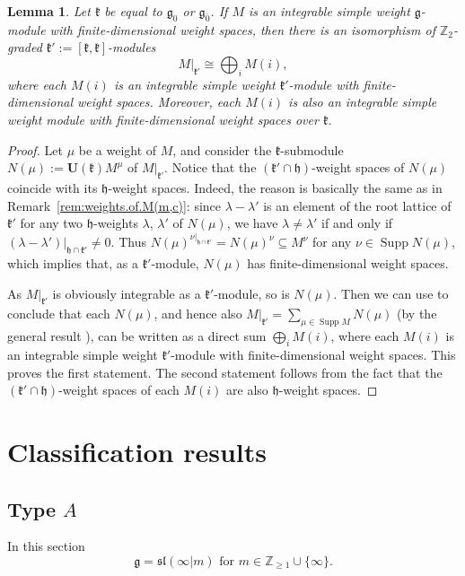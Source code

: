 \documentclass[12pt]{amsart}
\newcommand\Z{\mathbb{Z}}
\newcommand\g{\mathfrak{g}}
\newcommand\fh{\mathfrak{h}}
\newcommand\fsl{\mathfrak{sl}}
\newcommand\fk{\mathfrak{k}}
\newcommand\bU{\mathbf{U}}
\DeclareMathOperator{\Supp}{Supp} %
\theoremstyle{plain}
\newtheorem{lem}[theo]{Lemma}
\theoremstyle{definition}
\numberwithin{equation}{section}
\begin{document}
\begin{lem}\label{lem:ss.over.Lie}
Let $\fk$ be equal to $\g_0$ or $\g_{\bar 0}$. If $M$ is an integrable simple weight $\g$-module with finite-dimensional weight spaces, then there is an isomorphism of $\Z_2$-graded $\fk':=[\fk, \fk]$-modules
	\[
M|_{\fk'}\cong \bigoplus_i M(i),
	\]
where each $M(i)$ is an integrable simple weight $\fk'$-module with finite-dimensional weight spaces. Moreover, each $M(i)$ is also an integrable simple weight module with finite-dimensional weight spaces over $\fk$.
\end{lem}
\begin{proof}
Let $\mu$ be a weight of $M$, and consider the $\fk$-submodule $N(\mu) := \bU(\fk)M^\mu$ of $M|_{\fk'}$. Notice that the $(\fk'\cap \fh)$-weight spaces of $N(\mu)$ coincide with its $\fh$-weight spaces. Indeed, the reason is basically the same as in Remark~\ref{rem:weights.of.M(m,c)}: since $\lambda - \lambda'$ is an element of the root lattice of $\fk'$ for any two $\fh$-weights $\lambda$, $\lambda'$ of $N(\mu)$, we have $\lambda\neq \lambda'$ if and only if $(\lambda - \lambda') |_{\fh\cap \fk'} \neq 0$. Thus $N(\mu)^{\nu|_{\fh\cap \fk'}} = N(\mu)^\nu\subseteq M^\nu$ for any $\nu\in \Supp N(\mu)$, which implies that, as a $\fk'$-module, $N(\mu)$ has finite-dimensional weight spaces.

As $M|_{\fk'}$ is obviously integrable as a $\fk'$-module, so is $N(\mu)$. Then  we can use \cite[Theorem~3.7]{PS11} to conclude that each $N(\mu)$, and hence also $M|_{\fk'} = \sum_{\mu\in \Supp M} N(\mu)$ (by the general result \cite[Chapter XVII, Lemma~2.1]{Lan02}), can be written as a direct sum $\bigoplus_i M(i)$, where each $M(i)$ is an integrable simple weight $\fk'$-module with finite-dimensional weight spaces.  This proves the first statement. The second statement follows from the fact that the $(\fk'\cap \fh)$-weight spaces of each $M(i)$ are also $\fh$-weight spaces.
\end{proof}


\section{Classification results}\label{sec:classification}
\subsection{Type $A$}\label{sec:classification.type.A}
In this section 
	\[
\g = \fsl(\infty | m) \text{ for } m\in\Z_{\geq 1}\cup\{\infty\}.
	\]
	
\end{document}
